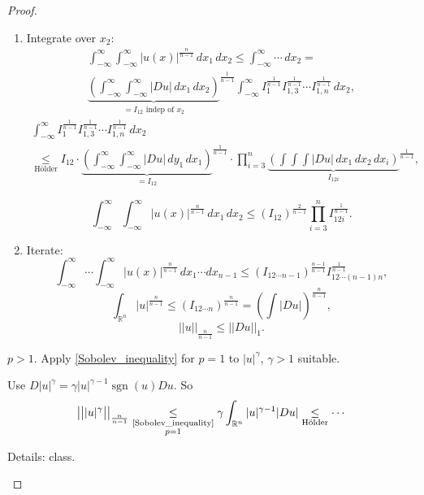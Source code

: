 \documentclass[12pt]{article}
\DeclareMathOperator{\sgn}{sgn}
\theoremstyle{definition}
\begin{document}
\begin{proof}
\begin{enumerate}[label=\alph*)]
\begin{enumerate}[label=\arabic*.]
\item Integrate over $x_2$:
\begin{multline*}
\int_{-\infty}^\infty\int_{-\infty}^\infty|u(x)|^{\frac n{n-1}}\,dx_1\,dx_2\leq\int_{-\infty}^\infty\cdots\,dx_2=\\
{\underbrace{\left(\int_{-\infty}^\infty\int_{-\infty}^\infty|Du|\,dx_1\,dx_2\right)}_{=I_{12}\text{ indep of }x_2}}^{\frac1{n-1}}\int_{-\infty}^\infty I_1^{\frac1{n-1}}I_{1,3}^{\frac1{n-1}}\cdots I_{1,n}^{\frac1{n-1}}\,dx_2,
\end{multline*}
\begin{multline*}
\int_{-\infty}^\infty I_1^{\frac1{n-1}}I_{1,3}^{\frac1{n-1}}\cdots I_{1,n}^{\frac1{n-1}}\,dx_2\\
\underset{\text{H\"older}}\leq I_{12}\cdot{\underbrace{\left(\int_{-\infty}^\infty\int_{-\infty}^\infty|Du|\,dy_1\,dx_1\right)}_{=I_{12}}}^{\frac1{n-1}}\cdot\prod_{i=3}^n{\underbrace{\left(\int\int\int|Du|\,dx_1\,dx_2\,dx_i\right)}_{I_{12i}}}^{\frac1{n-1}},
\end{multline*}

\[\int_{-\infty}^\infty\int_{-\infty}^\infty|u(x)|^{\frac n{n-1}}\,dx_1\,dx_2\leq(I_{12})^{\frac2{n-1}}\prod_{i=3}^nI_{12i}^{\frac1{n-1}}.\]

\item Iterate:
\[\int_{-\infty}^\infty\cdots\int_{-\infty}^\infty|u(x)|^{\frac n{n-1}}\,dx_1\cdots dx_{n-1}\leq(I_{12\cdots n-1})^{\frac{n-1}{n-1}}I_{12\cdots(n-1)n}^{\frac1{n-1}},\]
\[\int_{\mathbb R^n}|u|^{\frac n{n-1}}\leq(I_{12\cdots n})^{\frac n{n-1}}=\left(\int|Du|\right)^{\frac n{n-1}},\]
\[||u||_{\frac n{n-1}}\leq||Du||_1.\]
\end{enumerate}

$p>1$. Apply \eqref{Sobolev_inequality} for $p=1$ to $|u|^\gamma$, $\gamma>1$ suitable.

Use $D|u|^\gamma=\gamma|u|^{\gamma-1}\sgn(u)Du$. So
\[\big|\big||u|^\gamma\big|\big|_{\frac n{n-1}}\underset{\substack{\text{\eqref{Sobolev_inequality}}\\p=1}}\leq\gamma\int_{\mathbb R^n}|u|^{\gamma-1}|Du|\underset{\text{H\"older}}\leq\cdots\]

Details: class.
\end{enumerate}
\end{proof}
\end{document}
